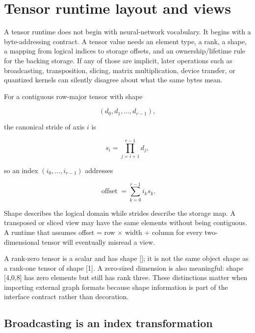\hypertarget{appendix-cebadf3106d1}{}\label{referencestart:appendix-cebadf3106d1}
\section{Tensor runtime layout and views}\label{appendix-cebadf3106d1-tensor-runtime-layout-and-views}

\hypertarget{appendix-cebadf3106d1-tensor-runtime-layout-and-views}{}

A tensor runtime does not begin with neural-network vocabulary. It begins with a byte-addressing contract. A tensor value needs an element type, a rank, a shape, a mapping from logical indices to storage offsets, and an ownership/lifetime rule for the backing storage. If any of those are implicit, later operations such as broadcasting, transposition, slicing, matrix multiplication, device transfer, or quantized kernels can silently disagree about what the same bytes mean.

For a contiguous row-major tensor with shape

\[
(d_0,d_1,\ldots,d_{r-1}),
\]

the canonical stride of axis \(i\) is

\[
s_i = \prod_{j=i+1}^{r-1} d_j,
\]

so an index \((i_0,\ldots,i_{r-1})\) addresses

\[
\operatorname{offset}=\sum_{k=0}^{r-1} i_k s_k.
\]

Shape describes the logical domain while strides describe the storage map. A transposed or sliced view may have the same elements without being contiguous. A runtime that assumes offset = row × width + column for every two-dimensional tensor will eventually misread a view.

A rank-zero tensor is a scalar and has shape {[}{]}; it is not the same object shape as a rank-one tensor of shape {[}1{]}. A zero-sized dimension is also meaningful: shape {[}4,0,8{]} has zero elements but still has rank three. These distinctions matter when importing external graph formats because shape information is part of the interface contract rather than decoration.

\subsection{Broadcasting is an index transformation}\label{appendix-cebadf3106d1-broadcasting-is-an-index-transformation}

\hypertarget{appendix-cebadf3106d1-broadcasting-is-an-index-transformation}{}


